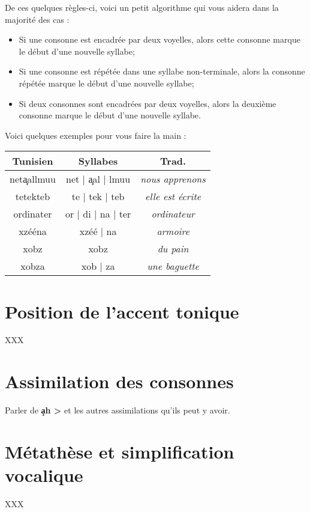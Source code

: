 De ces quelques règles-ci, voici un petit algorithme qui vous aidera dans la majorité des cas :
\begin{itemize}
    \item Si une consonne est encadrée par deux voyelles, alors cette consonne marque le début d'une nouvelle syllabe;
    \item Si une consonne est répétée dans une syllabe non-terminale, alors la consonne répétée marque le début d'une nouvelle syllabe;
    \item Si deux consonnes sont encadrées par deux voyelles, alors la deuxième consonne marque le début d'une nouvelle syllabe.
\end{itemize}

Voici quelques exemples pour vous faire la main :

\begin{center}
    \begin{tabular}{||c | c | c||} 
    \hline
    \textbf{Tunisien} & \textbf{Syllabes} & \textbf{Trad.}\\
    \hline\hline
    net\c{a}allmuu & net | \c{a}al | lmuu & \textit{nous apprenons}\\ 
    \hline
    tetekteb & te | tek | teb & \textit{elle est écrite}\\ 
    \hline
    ordinater & or | di | na | ter & \textit{ordinateur}\\ 
    \hline
    xzééna & xzéé | na & \textit{armoire}\\ 
    \hline
    xobz & xobz & \textit{du pain}\\ 
    \hline
    xobza & xob | za & \textit{une baguette}\\ 
    \hline
   \end{tabular}
\end{center}

\section{Position de l'accent tonique}
XXX

\section{Assimilation des consonnes}\label{Assimilation}
Parler de \textbf{\c{a}h > \textcrh\textcrh} et les autres assimilations qu'ils peut y avoir.

\section{Métathèse et simplification vocalique}
XXX

